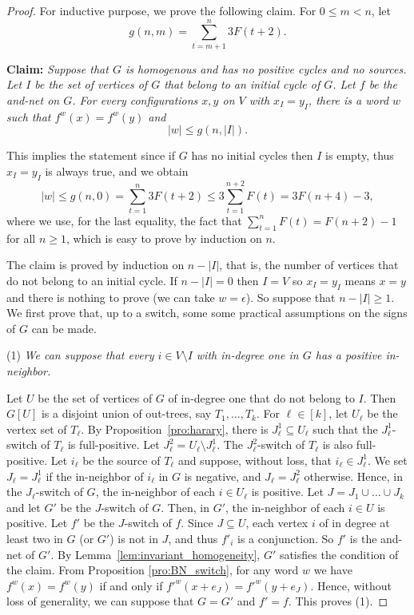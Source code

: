 \documentclass[11pt,letter]{article}
\begin{document}
\begin{proof}
For inductive purpose, we prove the following claim. For $0\leq m<n$, let 
\[
g(n,m)=\sum_{t=m+1}^n 3F(t+2).
\]

\bigskip
\noindent
{\bf Claim:} {\em Suppose that $G$ is homogenous and has no positive cycles and no sources. Let $I$ be the set of vertices of $G$ that belong to an initial cycle of $G$. Let $f$ be the and-net on $G$. For every configurations $x,y$ on $V$ with $x_I=y_I$, there is a word $w$ such that $f^w(x)=f^w(y)$ and}
\[
|w|\leq g(n,|I|).
\]

\bigskip
This implies the statement since if $G$ has no initial cycles then $I$ is empty, thus $x_I=y_I$ is always true, and we obtain 
\[
|w|\leq g(n,0)=\sum_{t=1}^{n} 3F(t+2)\leq 3\sum_{t=1}^{n+2} F(t)=3F(n+4)-3,
\]
where we use, for the last equality, the fact that $\sum_{t=1}^n F(t)=F(n+2)-1$ for all $n\geq 1$, which is easy to prove by induction on $n$. 

\medskip
The claim is proved by induction on $n-|I|$, that is, the number of vertices that do not belong to an initial cycle. If $n-|I|=0$ then $I=V$ so $x_I=y_I$ means $x=y$ and there is nothing to prove (we can take $w=\epsilon$). So suppose that $n-|I|\geq 1$. 
We first prove that, up to a switch, some some practical assumptions on the signs of $G$ can be made. 

\bigskip
\noindent
(1) {\em We can suppose that every $i\in V\setminus I$ with in-degree one in $G$ has a positive in-neighbor.}

\medskip
\noindent
Let $U$ be the set of vertices of $G$ of in-degree one that do not belong to $I$. Then $G[U]$ is a disjoint union of out-trees, say $T_1,\dots,T_k$. For $\ell\in [k]$, let $U_\ell$ be the vertex set of $T_\ell$. By Proposition~\ref{pro:harary}, there is $J^1_\ell\subseteq U_\ell$ such that the $J^1_\ell$-switch of $T_\ell$ is full-positive. Let $J^2_\ell=U_\ell\setminus J^1_\ell$. The $J^2_\ell$-switch of $T_\ell$ is also full-positive. Let $i_\ell$ be the source of $T_\ell$ and suppose, without loss, that $i_\ell\in J^1_\ell$. We set $J_\ell=J^1_\ell$ if the in-neighbor of $i_\ell$ in $G$ is negative, and $J_\ell=J^2_\ell$ otherwise. Hence, in the $J_\ell$-switch of $G$, the in-neighbor of each $i\in U_\ell$ is positive. Let $J=J_1\cup\dots\cup J_k$ and let $G'$ be the $J$-switch of $G$. Then, in $G'$, the in-neighbor of each $i\in U$ is positive. Let $f'$ be the $J$-switch of $f$. Since $J\subseteq U$, each vertex $i$ of in degree at least two in $G$ (or $G'$) is not in $J$, and thus $f'_i$ is a conjunction. So $f'$ is the and-net of $G'$. By Lemma~\ref{lem:invariant_homogeneity}, $G'$ satisfies the condition of the claim. From Proposition \ref{pro:BN_switch}, for any word $w$ we have $f^w(x)=f^w(y)$ if and only if $f'^w(x+e_J)=f'^w(y+e_J)$. Hence, without loss of generality, we can suppose that $G=G'$ and $f'=f$. This proves (1).


\end{proof}
\end{document}
